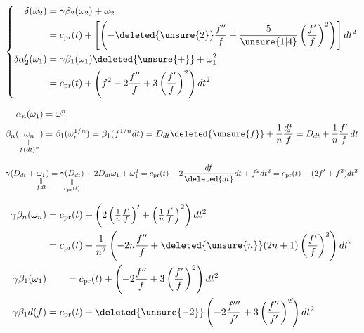 \[ \left\{\begin{aligned}
 \delta(\dot\omega_2)&=\gamma\beta_2(\omega_2)+\omega_2\\
 &=c_{\mathrm{pr}}(t)+\left[\left(-\deleted{\unsure{2}}\frac{f''}{f}+\frac{5}{\unsure{1|4}}\left(\frac{f'}{f}\right)^2\right)\right]dt^2\\
 \delta\alpha'_2(\omega_1)&=\gamma\beta_1(\omega_1)\deleted{\unsure{+}}+\omega_1^2\\
 &=c_{\mathrm{pr}}(t)+\left(f^2-2\frac{f''}{f}+3\left(\frac{f'}f\right)^2\right)dt^2
 \end{aligned}\right. \]

\[ \begin{aligned}
 \alpha_n(\omega_1)&=\omega_1^n\\
 \beta_n(\underset{\substack{\Vert\\f(dt)^n}}{\omega_n})&=\beta_1(\omega_n^{1/n})=\beta_1(f^{1/n}dt)=D_{dt}\deleted{\unsure{f}}+\frac1n\frac{df}{f}=D_{dt}+\frac1n\frac{f'}f\,dt
 \end{aligned} \]

\[ \gamma(D_{dt}+\underset{\substack{\Vert\\fdt}}{\omega_1})
 =\underset{\substack{\Vert\\c_{\mathrm{pr}}(t)}}{\gamma(D_{dt})}+2D_{dt}\omega_1+\omega_1^2
 =c_{\mathrm{pr}}(t)+2\frac{df}{\deleted{dt}}dt+f^2dt^2
 =c_{\mathrm{pr}}(t)+(2f'+f^2)dt^2 \]

\[ \begin{aligned}
 \gamma\beta_n(\omega_n)&=c_{\mathrm{pr}}(t)+\left(2\left(\tfrac1n\tfrac{f'}f\right)'+\left(\tfrac1n\tfrac{f'}f\right)^2\right)dt^2\\
 &=c_{\mathrm{pr}}(t)+\frac1{n^2}\left(-2n\frac{f''}{f}+\deleted{\unsure{n}}(2n+1)\left(\frac{f'}f\right)^2\right)dt^2\\
 \gamma\beta_1(\omega_1)&\qquad=c_{\mathrm{pr}}(t)+\left(-2\frac{f''}{f}+3\left(\frac{f'}f\right)^2\right)dt^2\\
 \gamma\beta_1d(f)&=c_{\mathrm{pr}}(t)+\deleted{\unsure{-2}}\left(-2\frac{f'''}{f'}+3\left(\frac{f''}{f'}\right)^2\right)dt^2
 \end{aligned} \]

